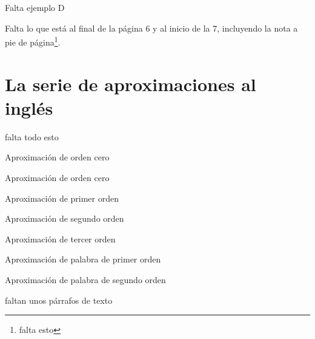 \begin{exmp}
Falta ejemplo D
\label{ej:d}
\end{exmp}

Falta lo que est\'{a} al final de la p\'{a}gina 6 y al inicio de la 7,
  incluyendo la nota a pie de p\'{a}gina\footnote{falta esto}.

\chapter{La serie de aproximaciones al ingl\'{e}s}

falta todo esto

\begin{exmp}
Aproximaci\'{o}n de orden cero
\label{ej:1}
\end{exmp}

\begin{exmp}
Aproximaci\'{o}n de orden cero
\label{ej:1}
\end{exmp}

\begin{exmp}
Aproximaci\'{o}n de primer orden
\label{ej:2}
\end{exmp}

\begin{exmp}
Aproximaci\'{o}n de segundo orden
\label{ej:3}
\end{exmp}

\begin{exmp}
Aproximaci\'{o}n de tercer orden
\label{ej:4}
\end{exmp}

\begin{exmp}
Aproximaci\'{o}n de palabra de primer orden 
\label{ej:5}
\end{exmp}

\begin{exmp}
Aproximaci\'{o}n de palabra de segundo orden 
\label{ej:6}
\end{exmp}

faltan unos p\'{a}rrafos de texto
